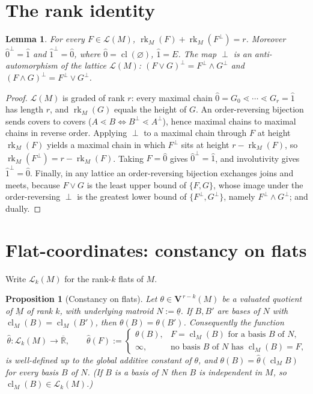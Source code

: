 \documentclass{article}
\newtheorem{proposition}[theorem]{Proposition}
\newtheorem{lemma}[theorem]{Lemma}
\theoremstyle{definition}
\newcommand{\Rbar}{\overline{\mathbb{R}}}
\newcommand{\rk}{\operatorname{rk}}
\newcommand{\cl}{\operatorname{cl}}
\newcommand{\bV}{\mathbf V}
\newcommand{\cLL}{\mathcal{L}}
\begin{document}
\section{The rank identity}

\begin{lemma}\label{lem:rank}
For every $F\in\cLL(M)$, $\rk_M(F)+\rk_M(F^{\perp})=r$. Moreover $\hat0^{\perp}=\hat1$ and
$\hat1^{\perp}=\hat0$, where $\hat0=\cl(\varnothing)$, $\hat1=E$. The map $\perp$ is an
anti-automorphism of the lattice $\cLL(M)$: $(F\vee G)^{\perp}=F^{\perp}\wedge G^{\perp}$ and
$(F\wedge G)^{\perp}=F^{\perp}\vee G^{\perp}$.
\end{lemma}

\begin{proof}
$\cLL(M)$ is graded of rank $r$: every maximal chain $\hat0=G_0\lessdot\cdots\lessdot G_r=\hat1$ has
length $r$, and $\rk_M(G)$ equals the height of $G$. An order-reversing bijection sends covers to
covers ($A\lessdot B\iff B^{\perp}\lessdot A^{\perp}$), hence maximal chains to maximal chains in
reverse order. Applying $\perp$ to a maximal chain through $F$ at height $\rk_M(F)$ yields a maximal
chain in which $F^{\perp}$ sits at height $r-\rk_M(F)$, so $\rk_M(F^{\perp})=r-\rk_M(F)$. Taking
$F=\hat0$ gives $\hat0^{\perp}=\hat1$, and involutivity gives $\hat1^{\perp}=\hat0$. Finally, in any
lattice an order-reversing bijection exchanges joins and meets, because $F\vee G$ is the least upper
bound of $\{F,G\}$, whose image under the order-reversing $\perp$ is the greatest lower bound of
$\{F^{\perp},G^{\perp}\}$, namely $F^{\perp}\wedge G^{\perp}$; and dually.
\end{proof}

\section{Flat-coordinates: constancy on flats}

Write $\cLL_k(M)$ for the rank-$k$ flats of $M$.

\begin{proposition}[Constancy on flats]\label{prop:constancy}
Let $\theta\in\bV^{\,r-k}(M)$ be a valuated quotient of $\underline M$ of rank $k$, with underlying
matroid $N:=\underline\theta$. If $B,B'$ are bases of $N$ with $\cl_M(B)=\cl_M(B')$, then
$\theta(B)=\theta(B')$. Consequently the function
\begin{equation}\label{eqn:hat-def}
  \widehat\theta\colon\cLL_k(M)\to\Rbar,\qquad
  \widehat\theta(F):=\begin{cases}\theta(B), & \text{$F=\cl_M(B)$ for a basis $B$ of $N$},\\
  \infty, & \text{no basis $B$ of $N$ has $\cl_M(B)=F$,}\end{cases}
\end{equation}
is well-defined up to the global additive constant of $\theta$, and $\theta(B)=\widehat\theta(\cl_M
B)$ for every basis $B$ of $N$. (If $B$ is a basis of $N$ then $B$ is independent in $M$, so
$\cl_M(B)\in\cLL_k(M)$.)
\end{proposition}
\end{document}
